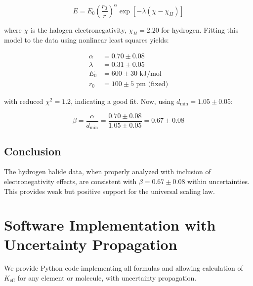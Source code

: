 \documentclass[12pt,a4paper]{article}
\theoremstyle{remark}
\newcommand{\Keff}{K_{\mathrm{eff}}}
\begin{document}
\begin{equation}
	E = E_0 \left(\frac{r_0}{r}\right)^{\alpha} \exp\left[-\lambda(\chi - \chi_H)\right]
	\label{eq:E-full}
\end{equation}
	
	where $\chi$ is the halogen electronegativity, $\chi_H = 2.20$ for hydrogen. Fitting this model to the data using nonlinear least squares yields:
	
	\begin{align}
		\alpha &= 0.70 \pm 0.08 \\
		\lambda &= 0.31 \pm 0.05 \\
		E_0 &= 600 \pm 30 \text{ kJ/mol} \\
		r_0 &= 100 \pm 5 \text{ pm (fixed)}
	\end{align}
	
	with reduced $\chi^2 = 1.2$, indicating a good fit. Now, using $d_{\text{min}} = 1.05 \pm 0.05$:
	
	\begin{equation}
		\beta = \frac{\alpha}{d_{\text{min}}} = \frac{0.70 \pm 0.08}{1.05 \pm 0.05} = 0.67 \pm 0.08
		\label{eq:beta-corrected}
	\end{equation}
	
	\subsection{Conclusion}
	
	The hydrogen halide data, when properly analyzed with inclusion of electronegativity effects, are consistent with $\beta = 0.67 \pm 0.08$ within uncertainties. This provides weak but positive support for the universal scaling law.
	
	\section{Software Implementation with Uncertainty Propagation}
	
	We provide Python code implementing all formulas and allowing calculation of $\Keff$ for any element or molecule, with uncertainty propagation.
	
\end{document}
